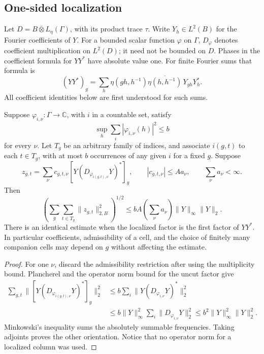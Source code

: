 \subsection{One-sided localization}

Let \(D=B\bar\otimes L_\eta(\Gamma)\), with its product trace \(\tau\).
Write \(Y_h\in L^2(B)\) for the Fourier coefficients of \(Y\).  For a
bounded scalar function \(\varphi\) on \(\Gamma\), \(D_\varphi\) denotes
coefficient multiplication on \(L^2(D)\); it need not be bounded on
\(D\).  Phases in the coefficient formula for \(YY^*\) have absolute
value one.  For finite Fourier sums that formula is
\[
 (YY^*)_g=\sum_h
 \eta(gh,h^{-1})\overline{\eta(h,h^{-1})}\,Y_{gh}Y_h^*.
\]
All coefficient identities below are first understood for such sums.

\begin{lemma}\label{lem:ray-unary}
Suppose \(\varphi_{i,\nu}:\Gamma\to\mathbb C\), with \(i\) in a
countable set, satisfy
\[
 \sup_h\sum_i|\varphi_{i,\nu}(h)|^2\le b
\]
for every \(\nu\).  Let \(T_g\) be an arbitrary family of indices, and
associate \(i(g,t)\) to each \(t\in T_g\), with at most \(b\) occurrences
of any given \(i\) for a fixed \(g\).  Suppose
\[
 z_{g,t}=\sum_\nu c_{g,t,\nu}
       [Y(D_{\varphi_{i(g,t),\nu}}Y)^*]_g,
 \qquad |c_{g,t,\nu}|\le A a_\nu,
 \qquad \sum_\nu a_\nu<\infty.
\]
Then
\begin{equation}\label{eq:ray-unary}
 \left(\sum_g\sum_{t\in T_g}\|z_{g,t}\|_{2,B}^2\right)^{1/2}
 \le b A\left(\sum_\nu a_\nu\right)
               \|Y\|_\infty\|Y\|_2.
\end{equation}
There is an identical estimate when the localized factor is the first
factor of \(YY^*\).  In particular coefficients, admissibility of a
cell, and the choice of finitely many companion cells may depend on
\(g\) without affecting the estimate.
\end{lemma}

\begin{proof}
For one \(\nu\), discard the admissibility restriction after using
the multiplicity bound.  Plancherel and the operator norm bound for
the uncut factor give
\[
 \begin{split}
 \sum_{g,t}\|[Y(D_{\varphi_{i(g,t),\nu}}Y)^*]_g\|_2^2
 &\le b\sum_i\|Y(D_{\varphi_{i,\nu}}Y)^*\|_2^2\\
 &\le b\|Y\|_\infty^2
                   \sum_i\|D_{\varphi_{i,\nu}}Y\|_2^2
 \le b^2\|Y\|_\infty^2\|Y\|_2^2.
 \end{split}
\]
Minkowski's inequality sums the absolutely summable frequencies.  Taking
adjoints proves the other orientation.  Notice that no operator norm
for a localized column was used.
\end{proof}


